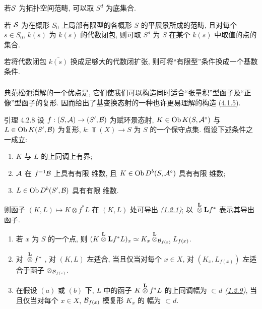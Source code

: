 若\pageoriginale ${\mathcal S}$ 为拓扑空间范畴, 可以取 $S^d$ 为底集合.

若 ${\mathcal S}$ 为在概形 $S_0$ 上局部有限型的各概形 $S$ 的平展景所成的范畴, 且对每个 $s\in S_0$, $\bar{k(s)}$ 为 $k(s)$ 的代数闭包, 则可取 $S^d$ 为 $S$ 在某个 $\bar{k(s)}$ 中取值的点的集合.

若将代数闭包 $\bar{k(s)}$ 换成足够大的代数闭扩张, 则可将“有限型”条件换成一个基数条件.

\setcounter{subsubsection}{6}
\subsubsection{}
典范松弛消解的一个优点是, 它们使我们可以构造同时适合“张量积”型函子及“正像”型函子的复形. 因而给出了基变换态射的一种也许更易理解的构造 (\hyperref[XVII.prop4.1.5]{4.1.5}).


\begin{enonce*}{引理 4.2.8}
设 $f:(S,{\mathcal A})\rightarrow(S',{\mathcal B})$ 为赋环景态射, $K\in\operatorname{Ob} K(S,{\mathcal A}^{\circ})$ 与 $L\in\operatorname{Ob} K(S',{\mathcal B})$ 为复形, $k:\Top(X)\rightarrow S$ 为 $S$ 的一个保守点集. 假设下述条件之一成立:
\begin{enumerate}
\renewcommand{\theenumi}{\alph{enumi}}
\renewcommand{\labelenumi}{\theenumi)}
\item $K$ 与 $L$ 的上同调上有界;

\item ${\mathcal A}$ 在 $f^{-1}{\mathcal B}$ 上具有有限 \tTor 维数, 且 $K\in\operatorname{Ob} D^b(S,{\mathcal A}^{\circ})$ 具有有限 \tTor 维数;

\item $L\in\operatorname{Ob} D^b(S',{\mathcal B})$ 具有有限 \tTor 维数.
\end{enumerate}

则\pageoriginale 函子 $(K,L)\mapsto K\otimes f^{\ast}L$ 在 $(K,L)$ 处可导出 \emph{(\hyperref[XVII.def1.2.1]{1.2.1})}; 以 ${}\overset{\mathbf{L}}{\otimes}\mathbf{L} f^{\ast}$ 表示其导出函子.
\begin{enumerate}
\renewcommand{\theenumi}{\roman{enumi}}
\renewcommand{\labelenumi}{(\theenumi)}
\item 若 $x$ 为 $S$ 的一个点, 则 $(K\overset{\mathbf{L}}{\otimes}\mathbf{L} f^{\ast}L)_x\simeq
K_x\overset{\mathbf{L}}{\otimes}_{{\mathcal B}_{f(x)}}L_{f(x)}$.

\item 对 ${}\overset{\mathbf{L}}{\otimes}f^{\ast}$ , 对 $(K,L)$ 左适合, 当且仅当对每个 $x\in X$, 对 $(K_x,L_{f(x)})$ 左适合于函子 $\otimes_{{\mathcal B}_{f(x)}}$.

\item 在假设 $(a)$ 或 $(b)$ 下, $L$ 中的函子 $K\overset{\mathbf{L}}{\otimes}f^{\ast}L$ 的上同调幅为 $\subset d$ \emph{(\hyperref[XVII.def1.2.9]{1.2.9})}, 当且仅当对每个 $x\in X$, ${\mathcal B}_{f(x)}$ 模复形 $K_x$ 的 \tTor 幅为 $\subset d$.
\end{enumerate}
\end{enonce*}

